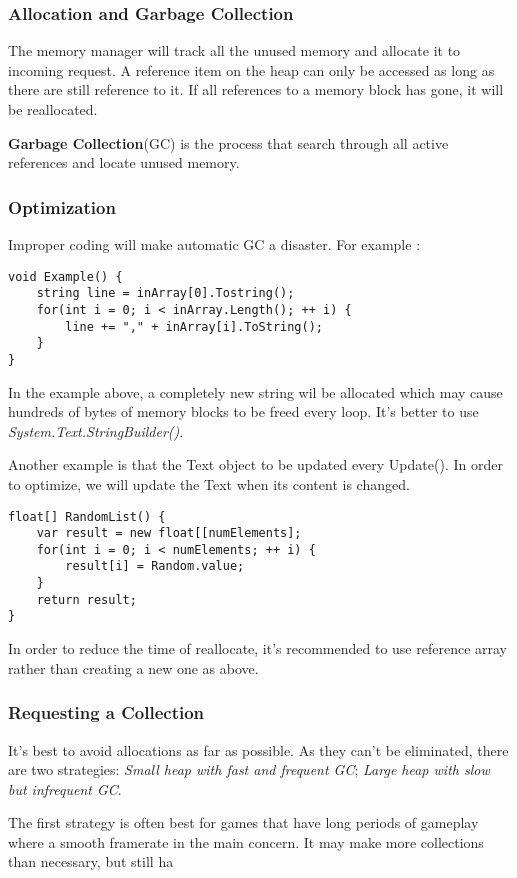 \documentclass[10pt, a4paper]{article}
\begin{document}
            \subsubsection{Allocation and Garbage Collection}
                The memory manager will track all the unused memory and allocate it to incoming request. A reference item on the heap can only be accessed as long as there are still reference to it. If all references to a memory block has gone, it will be reallocated.

                \textbf{Garbage Collection}(GC) is the process that search through all active references and locate unused memory. 
            \subsubsection{Optimization}
                Improper coding will make automatic GC a disaster. For example : 
\begin{lstlisting}
void Example() {
    string line = inArray[0].Tostring(); 
    for(int i = 0; i < inArray.Length(); ++ i) {
        line += "," + inArray[i].ToString();
    }
}
\end{lstlisting}           

                In the example above, a completely new string wil be allocated which may cause hundreds of bytes of memory blocks to be freed every loop. It's better to use \emph{System.Text.StringBuilder()}.

                Another example is that the Text object to be updated every Update(). In order to optimize, we will update the Text when its content is changed. 
            
\begin{lstlisting}
float[] RandomList() {
    var result = new float[[numElements]; 
    for(int i = 0; i < numElements; ++ i) {
        result[i] = Random.value; 
    }
    return result; 
}
\end{lstlisting} 

                In order to reduce the time of reallocate, it's recommended to use reference array rather than creating a new one as above. 
            
            \subsubsection{Requesting a Collection}
                It's best to avoid allocations as far as possible. As they can't be eliminated, there are two strategies: \emph{Small heap with fast and frequent GC}; \emph{Large heap with slow but infrequent GC}. 

                The first strategy is often best for games that have long periods of gameplay where a smooth framerate in the main concern. It may make more collections than necessary, but still ha
\end{document}
